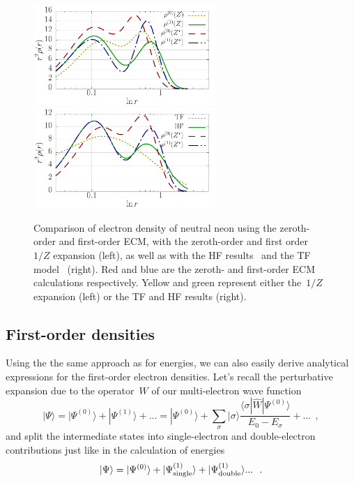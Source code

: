 		\begin{figure} 
 			\centering
 			\includegraphics[width=69mm]{Graphs/Ne_rho.pdf} 
 			\includegraphics[width=69mm]{Graphs/Ne_rho2.pdf} 
 			\caption{Comparison of electron density of neutral neon using the zeroth-order and first-order ECM, with the zeroth-order and first order~$1/Z$ expansion (left), as well as with the HF results~\cite{jonsson_new_2013} and the TF model~\cite{LandauQM} (right). Red and blue are the zeroth- and first-order ECM calculations respectively. Yellow and green represent either the~$1/Z$ expansion (left) or the TF and HF results (right).} \label{NeonPlot}
 		\end{figure}

\subsection{First-order densities}

Using the the same approach as for energies, we can also easily derive analytical expressions for the first-order electron densities. Let's recall the perturbative expansion due to the operator~$W$ of our
multi-electron wave function
\begin{equation}
|\Psi \rangle = |\Psi^{(0)} \rangle + |\Psi^{(1)}\rangle +... = |\Psi^{(0)} \rangle + \sum_{\sigma} |\sigma\rangle \frac{\langle \sigma|\widehat{W}| \Psi^{(0)} \rangle}{E_0 - E_\sigma} +...~~,
\end{equation}
and split the intermediate states into single-electron and double-electron contributions just like in the calculation of energies
\begin{equation}
|\Psi \rangle = |\Psi^{(0)} \rangle + |\Psi^{(1)}_{\rm{single}}\rangle + |\Psi^{(1)}_{\rm{double}}\rangle...~~.
\end{equation}


